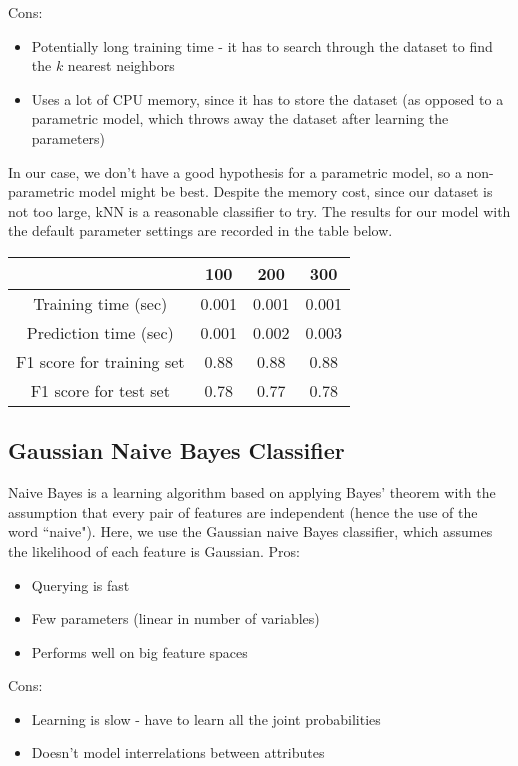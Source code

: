 \documentclass[12 pt]{article}
\numberwithin{equation}{section}
\begin{document}
Cons:
\begin{itemize}
	\item Potentially long training time - it has to search through the dataset to find the $k$ nearest neighbors
	\item Uses a lot of CPU memory, since it has to store the dataset (as opposed to a parametric model, which throws away the dataset after learning the parameters)
\end{itemize}

In our case, we don't have a good hypothesis for a parametric model, so a non-parametric model might be best. Despite the memory cost, since our dataset is not too large, kNN is a reasonable classifier to try. The results for our model with the default parameter settings are recorded in the table below.

\begin{center}
  \begin{tabular}{| c | c | c | c | }
    \hline
    & 100 & 200 & 300 \\ \hline
    Training time (sec) & 0.001 & 0.001 & 0.001 \\ \hline
    Prediction time (sec) & 0.001 & 0.002 & 0.003 \\ \hline 
    F1 score for training set & 0.88  & 0.88 & 0.88 \\ \hline
    F1 score for test set & 0.78 & 0.77 & 0.78 \\ \hline
  \end{tabular}
\end{center}

\subsection{Gaussian Naive Bayes Classifier}
Naive Bayes is a learning algorithm based on applying Bayes' theorem with the assumption that every pair of features are independent (hence the use of the word ``naive"). Here, we use the Gaussian naive Bayes classifier, which assumes the likelihood of each feature is Gaussian.
Pros:
\begin{itemize}
	\item Querying is fast
	\item Few parameters (linear in number of variables)
	\item Performs well on big feature spaces
\end{itemize}

Cons:
\begin{itemize}
	\item Learning is slow - have to learn all the joint probabilities
	\item Doesn't model interrelations between attributes
\end{itemize}
\end{document}
